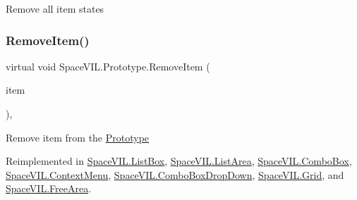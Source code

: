 Remove all item states 

\mbox{\label{class_space_v_i_l_1_1_prototype_a7a2aabccfe6389f71d0265fa73f0ae87}} 
\subsubsection{\texorpdfstring{Remove\+Item()}{RemoveItem()}}
{\footnotesize\ttfamily virtual void Space\+V\+I\+L.\+Prototype.\+Remove\+Item (\begin{DoxyParamCaption}\item[{\mbox{\hyperlink{interface_space_v_i_l_1_1_core_1_1_i_base_item}{I\+Base\+Item}}}]{item }\end{DoxyParamCaption})\hspace{0.3cm}{\ttfamily [inline]}, {\ttfamily [virtual]}}



Remove item from the \mbox{\hyperlink{class_space_v_i_l_1_1_prototype}{Prototype}} 



Reimplemented in \mbox{\hyperlink{class_space_v_i_l_1_1_list_box_a3fac47d275899619c3f705c24816ff87}{Space\+V\+I\+L.\+List\+Box}}, \mbox{\hyperlink{class_space_v_i_l_1_1_list_area_a0020756686088a62a43388973fa2d7bf}{Space\+V\+I\+L.\+List\+Area}}, \mbox{\hyperlink{class_space_v_i_l_1_1_combo_box_a646108f1b822d481ae32b68e7bd3f44f}{Space\+V\+I\+L.\+Combo\+Box}}, \mbox{\hyperlink{class_space_v_i_l_1_1_context_menu_a35bae3cc791ba6de129af36ddb0fb63b}{Space\+V\+I\+L.\+Context\+Menu}}, \mbox{\hyperlink{class_space_v_i_l_1_1_combo_box_drop_down_a78a089740c66f8d4cf151da273eafd73}{Space\+V\+I\+L.\+Combo\+Box\+Drop\+Down}}, \mbox{\hyperlink{class_space_v_i_l_1_1_grid_a75bf61cabb387baea7461141dce079fb}{Space\+V\+I\+L.\+Grid}}, and \mbox{\hyperlink{class_space_v_i_l_1_1_free_area_ae9b39df00c0fa786b4072b8e49e3aacc}{Space\+V\+I\+L.\+Free\+Area}}.

\mbox{\label{class_space_v_i_l_1_1_prototype_a2c7109a2346956afe3e03958e6d2701c}} 

